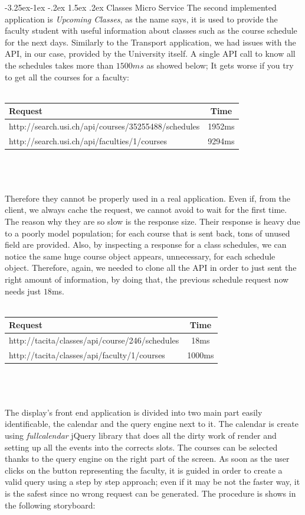 \documentclass[]{usiinfbachelorproject}
\makeatletter
\newcommand\subsubsection{\@startsection{subsubsection}{3}{\z@}%
                {-3.25ex\@plus -1ex \@minus -.2ex}%
                {1.5ex \@plus .2ex}%
                {\normalfont\normalsize\bfseries}}
\makeatother
\begin{document}
\subsubsection{Classes Micro Service}
The second implemented application is \emph{Upcoming Classes}, as the name says, it is used to provide the faculty student with useful information about classes such as the course schedule for the next days. Similarly to the Transport application, we had issues with the API, in our case, provided by the University itself.
A single API call to know all the schedules takes more than $1500ms$ as showed below;
It gets worse if you try to get all the courses for a faculty:
\\
\\
\begin{tabular}{ l | c }
	Request & Time \\
	\hline
	http://search.usi.ch/api/courses/35255488/schedules & 1952ms \\
	http://search.usi.ch/api/faculties/1/courses & 9294ms\\
\end{tabular}
\\
\\
\\
Therefore they cannot be properly used in a real application. Even if, from the client, we always cache the request, we cannot avoid to wait for the first time. The reason why they are so slow is the response size. Their response is heavy due to a poorly model population; for each course that is sent back, tons of unused field are provided. Also, by inspecting a response for a class schedules, we can notice the same huge course object appears, unnecessary, for each schedule object.
Therefore, again, we needed to clone all the API in order to just sent the right amount of information, by doing that, the previous schedule request now needs just $18$ms.
\\
\\
\begin{tabular}{ l | c }
	Request & Time \\
	\hline
	 http://tacita/classes/api/course/246/schedules & 18ms \\
	 http://tacita/classes/api/faculty/1/courses & 1000ms\\
\end{tabular}
\\
\\
\\
The display's front end application is divided into two main part easily identificable, the calendar and the query engine next to it. The calendar is create using \emph{fullcalendar} jQuery library that does all the dirty work of render and setting up all the events into the corrects slots. 
The courses can be selected thanks to the query engine on the right part of the screen. As soon as the user clicks on the button representing the faculty, it is guided in order to create a valid query using a step by step approach; even if it may be not the faster way, it is the safest since no wrong request can be generated. The procedure is shows in the following storyboard:
\end{document}
